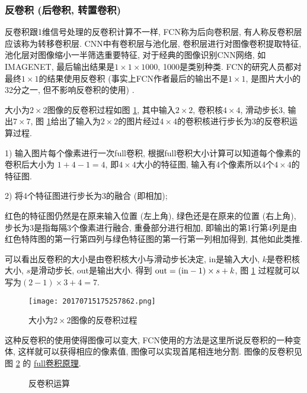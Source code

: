 \subsubsection{反卷积 (后卷积, 转置卷积)}

反卷积跟1维信号处理的反卷积计算不一样, FCN称为后向卷积层, 有人称反卷积层应该称为转移卷积层.
CNN中有卷积层与池化层, 卷积层进行对图像卷积提取特征, 池化层对图像缩小一半筛选重要特征, 对于经典的图像识别CNN网络, 如IMAGENET, 最后输出结果是$1\times 1\times 1000$, 1000是类别种类.
FCN的研究人员都对最终$1\times 1$的结果使用反卷积 (事实上FCN作者最后的输出不是$1\times 1$, 是图片大小的32分之一, 但不影响反卷积的使用) .
\begin{example}
大小为$2\times 2$图像的反卷积过程如图 \ref{20170715175257862}, 其中输入$2\times 2$, 卷积核$4\times 4$, 滑动步长3, 输出$7\times 7$, 图 \ref{20170715175257862}给出了输入为$2\times 2$的图片经过$4\times 4$的卷积核进行步长为3的反卷积运算过程.

1) 输入图片每个像素进行一次full卷积, 根据full卷积大小计算可以知道每个像素的卷积后大小为 $1+4-1=4$, 即$4\times 4$大小的特征图, 输入有4个像素所以4个$4\times 4$的特征图.

2) 将4个特征图进行步长为3的融合 (即相加);

\begin{remark}
    红色的特征图仍然是在原来输入位置 (左上角), 绿色还是在原来的位置 (右上角), 步长为3是指每隔3个像素进行融合, 重叠部分进行相加, 即输出的第1行第4列是由红色特阵图的第一行第四列与绿色特征图的第一行第一列相加得到, 其他如此类推.
\end{remark}

可以看出反卷积的大小是由卷积核大小与滑动步长决定, in是输入大小, $k$是卷积核大小, $s$是滑动步长, out是输出大小.
得到 $\textup{out} = (\textup{in} - 1) \times  s + k$, 图 \ref{20170715175257862} 过程就可以写为$ (2 - 1)\times 3 + 4 = 7$.
\begin{figure}[H]
    \centering
    \texttt{[image: 20170715175257862.png]}
    \caption{大小为$2\times 2$图像的反卷积过程}
    \label{20170715175257862}
\end{figure}
\vspace{-0.4cm}
\end{example}
这种反卷积的使用使得图像可以变大, FCN使用的方法是这里所说反卷积的一种变体, 这样就可以获得相应的像素值, 图像可以实现首尾相连地分割. 
图像的反卷积见图 \ref{Dconop0203} 的 \href{https://github.com/vdumoulin/conv_arithmetic}{full卷积原理}.
\begin{figure}[H]
\centering
{}
\caption{反卷积运算}
\label{Dconop0203}
\end{figure}

